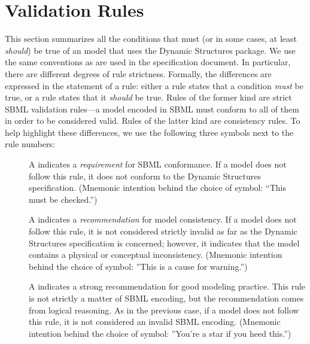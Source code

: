 \newcommand{\printValid}{\validRule{arrays-\arabic{arraysCtr}\addtocounter{arraysCtr}{1}}}
\section{Validation Rules}
\label{validation}

This section summarizes all the conditions that must (or in some cases, at least \emph{should}) be true of an \sbmlthree model that uses the Dynamic Structures package. We use the same conventions as are used in the \sbmlthreecore specification document. In particular, there are different degrees of rule strictness. Formally, the differences are expressed in the statement of a rule: either a rule states that a condition \emph{must} be true, or a rule states that it \emph{should} be true. Rules of the former kind are strict SBML validation rules---a model encoded in SBML must conform to all of them in order to be considered valid.  Rules of the latter kind are consistency rules. To help highlight these differences, we use the following three symbols next to the rule numbers:

\begin{description}

\item[\hspace*{6.5pt}\vSymbol\vsp] A \vSymbolName indicates a
  \emph{requirement} for SBML conformance. If a model does not follow
  this rule, it does not conform to the Dynamic Structures
  specification.  (Mnemonic intention behind the choice of symbol:
  ``This must be checked.'')

\item[\hspace*{6.5pt}\cSymbol\csp] A \cSymbolName indicates a
  \emph{recommendation} for model consistency.  If a model does not
  follow this rule, it is not considered strictly invalid as far as the
  Dynamic Structures specification is concerned; however, it
  indicates that the model contains a physical or conceptual
  inconsistency.  (Mnemonic intention behind the choice of symbol:
  ''This is a cause for warning.'')

\item[\hspace*{6.5pt}\mSymbol\msp] A \mSymbolName indicates a strong
  recommendation for good modeling practice.  This rule is not strictly
  a matter of SBML encoding, but the recommendation comes from logical
  reasoning.  As in the previous case, if a model does not follow this
  rule, it is not considered an invalid SBML encoding.  (Mnemonic
  intention behind the choice of symbol: ''You're a star if you heed
  this.'')
\end{description}

